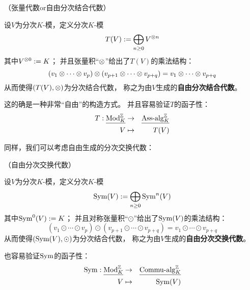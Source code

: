 \begin{definition}（张量代数or自由分次结合代数）

设$V$为分次$K$-模，定义分次$K$-模
$$T(V):=%
\bigoplus_{n\geq 0}V^{\ten n}$$
其中$V^{\otimes 0}:=K$；
并且张量积“$\otimes$”给出了$T(V)$的乘法结构：
$$(v_1\otimes\cdots\otimes v_p)\otimes(v_{p+1}\otimes\cdots\otimes v_{p+q})
=v_1\otimes\cdots\otimes v_{p+q}$$
从而使得$(T(V),\otimes)$为分次结合代数，
称之为由$V$生成的\textbf{自由分次结合代数}。
\end{definition}

这的确是一种非常“自由”的构造方式。
并且容易验证$T$的函子性：
\begin{eqnarray*}
T:\underline{\operatorname{Mod}^{\mathbb{Z}}_{K}}&\to& \underline{\operatorname{Ass}\!\text{-}\!\operatorname{alg}^{\mathbb{Z}}_{K}}\\
V&\mapsto& T(V)
\end{eqnarray*}

同样，我们可以考虑自由生成的分次交换代数：

\begin{definition}（自由分次交换代数）

设$V$为分次$K$-模，定义分次$K$-模
$$\Sym(V):=%
\bigoplus_{n\geq 0}\Sym^n(V)$$
其中$\operatorname{Sym}^0(V):=K$；
并且对称张量积“$\odot$”给出了$\operatorname{Sym}(V)$的乘法结构：
$$(v_1\odot\cdots\odot v_p)\odot
(v_{p+1}\odot\cdots\odot v_{p+q})
=v_1\odot\cdots\odot v_{p+q}$$
从而使得$(\operatorname{Sym}(V),\odot)$为分次结合代数，
称之为由$V$生成的\textbf{自由分次交换代数}。
\end{definition}

也容易验证$\operatorname{Sym}$的函子性：
\begin{eqnarray*}
\operatorname{Sym}:\underline{\operatorname{Mod}^{\mathbb{Z}}_{K}} &\to& \underline{\operatorname{Commu}\!\text{-}\!\operatorname{alg}^{\mathbb{Z}}_{K}}\\
V &\mapsto& \operatorname{Sym}(V)
\end{eqnarray*}

